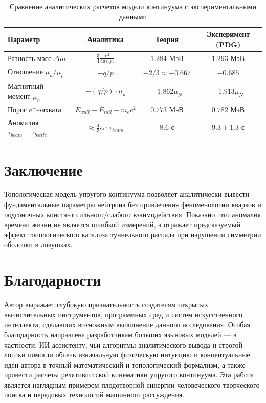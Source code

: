 \documentclass[12pt,a4paper]{article}
\begin{document}

\begin{table}[h]
\centering
\caption{Сравнение аналитических расчетов модели континуума с экспериментальными данными}
\label{tab:neutron_data}
\renewcommand{\arraystretch}{1.4}
\begin{tabular}{l c c c}
\toprule
\textbf{Параметр} & \textbf{Аналитика} & \textbf{Теория} & \textbf{Эксперимент (PDG)} \\
\midrule
Разность масс $\Delta m$ & $\frac{3}{4} \frac{e^2}{4\pi\varepsilon_0 r_c}$ & $1.284$ МэВ & $1.293$ МэВ \\
Отношение $\mu_n / \mu_p$ & $-q/p$ & $-2/3 \approx -0.667$ & $-0.685$ \\
Магнитный момент $\mu_n$ & $-(q/p) \cdot \mu_p$ & $-1.862 \mu_N$ & $-1.913 \mu_N$ \\
Порог $e^-$-захвата & $E_{wall} - E_{tail} - m_e c^2$ & $0.773$ МэВ & $0.782$ МэВ \\
Аномалия $\tau_{beam} - \tau_{bottle}$ & $\approx \frac{4}{3} \alpha \cdot \tau_{beam}$ & $8.6$ с & $9.3 \pm 1.3$ с \\
\bottomrule
\end{tabular}
\end{table}

\section{Заключение}
Топологическая модель упругого континуума позволяет аналитически вывести фундаментальные параметры нейтрона без привлечения феноменологии кварков и подгоночных констант сильного/слабого взаимодействия. Показано, что аномалия времени жизни не является ошибкой измерений, а отражает предсказуемый эффект топологического катализа туннельного распада при нарушении симметрии оболочки в ловушках.

\section*{Благодарности}
Автор выражает глубокую признательность создателям открытых вычислительных инструментов, программных сред и систем искусственного интеллекта, сделавших возможным выполнение данного исследования. Особая благодарность направлена разработчикам больших языковых моделей — в частности, ИИ-ассистенту, чьи алгоритмы аналитического вывода и строгой логики помогли облечь изначальную физическую интуицию и концептуальные идеи автора в точный математический и топологический формализм, а также провести расчеты релятивистской кинематики упругого континуума. Эта работа является наглядным примером плодотворной синергии человеческого творческого поиска и передовых технологий машинного рассуждения.
\end{document}
